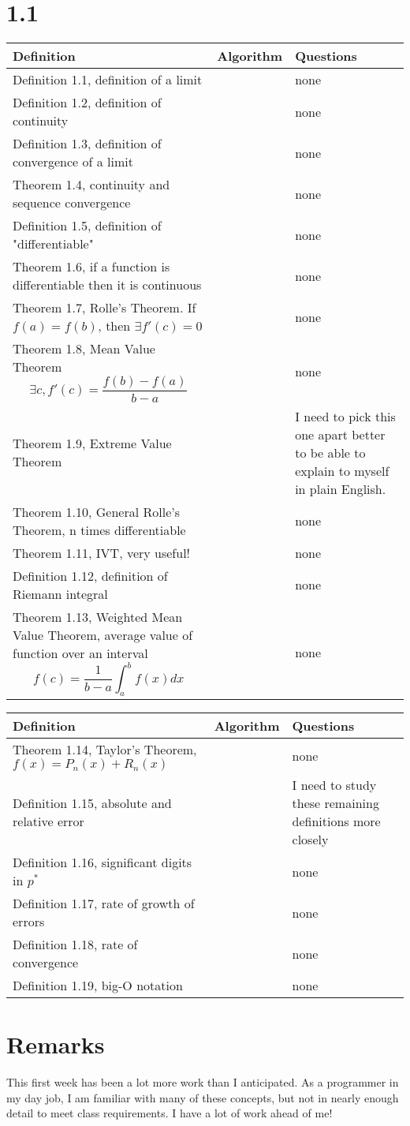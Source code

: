 \documentclass{article}
\begin{document}
\section*{1.1}

\begin{tabularx}{\textwidth}{ |X|l|X| }
    \hline
	{\bf Definition} & {\bf Algorithm} & {\bf Questions} \\
    \hline
	Definition 1.1, definition of a limit & & none \\
    \hline
	Definition 1.2, definition of continuity & & none \\
    \hline
	Definition 1.3, definition of convergence of a limit & & none \\
    \hline
	Theorem 1.4, continuity and sequence convergence & & none \\
    \hline
	Definition 1.5, definition of "differentiable" & & none \\
    \hline
	Theorem 1.6, if a function is differentiable then it is continuous & & none \\
    \hline
	Theorem 1.7, Rolle's Theorem. If $f(a)=f(b)$, then $\exists f'(c)=0$ & & none \\
    \hline
	Theorem 1.8, Mean Value Theorem
	$$ \exists c, f'(c)= \frac{f(b)-f(a)}{b-a} $$ & & none \\
    \hline
	Theorem 1.9, Extreme Value Theorem & & I need to pick this one apart better to be able to explain to myself in plain English. \\
    \hline
	Theorem 1.10, General Rolle's Theorem, n times differentiable & & none \\
    \hline
	Theorem 1.11, IVT, very useful! & & none \\
    \hline
	Definition 1.12, definition of Riemann integral & & none \\
    \hline
	Theorem 1.13, Weighted Mean Value Theorem, average value of function over an interval
	$$ f(c)=\frac{1}{b-a} \int_{a}^{b} f(x)dx $$ & & none \\
    \hline
\end{tabularx}
\begin{tabularx}{\textwidth}{ |X|l|X| }
    \hline
	{\bf Definition} & {\bf Algorithm} & {\bf Questions} \\
    \hline
	Theorem 1.14, Taylor's Theorem, $f(x)=P_n(x)+R_n(x)$ & & none \\
    \hline
	Definition 1.15, absolute and relative error & & I need to study these remaining definitions more closely \\
    \hline
	Definition 1.16, significant digits in $p^*$ & & none \\
    \hline
	Definition 1.17, rate of growth of errors & & none \\
    \hline
	Definition 1.18, rate of convergence & & none \\
    \hline
	Definition 1.19, big-O notation & & none \\
    \hline
\end{tabularx}

\section*{Remarks}

This first week has been a lot more work than I anticipated.
As a programmer in my day job, I am familiar with many of these concepts, but not in nearly enough detail to meet class requirements.
I have a lot of work ahead of me!
\end{document}
